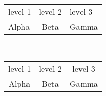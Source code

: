 \usepackage{tabularx}

\begin{tabularx}{0.6\textwidth}{XcX}
\hline
    level 1 & level 2 & level 3\\
    Alpha&Beta&Gamma\\
    \hline
\end{tabularx}\\

\begin{tabular*}{0.6\textwidth}[]{ccc}
    \hline
    level 1 & level 2 & level 3\\
    Alpha &Beta &Gamma\\
    \hline
\end{tabular*}
